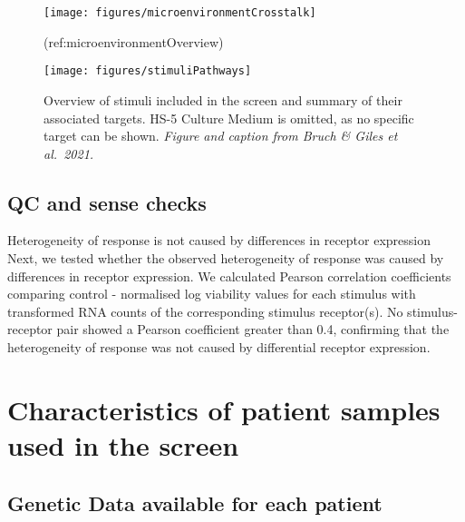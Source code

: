 \documentclass[11pt, a4paper, twosided]{book}
\begin{document}
\begin{figure}

{\centering \texttt{[image: figures/microenvironmentCrosstalk]} 

}

\caption{(ref:microenvironmentOverview)}\label{fig:microenvironmentCrosstalk}
\end{figure}

\begin{figure}

{\centering \texttt{[image: figures/stimuliPathways]} 

}

\caption{Overview of stimuli included in the screen and summary of their associated targets. HS-5 Culture Medium is omitted, as no specific target can be shown. \emph{Figure and caption from Bruch \& Giles et al.~2021.}}\label{fig:stimuliPathways}
\end{figure}
\hypertarget{qc-and-sense-checks}{%
\subsection{QC and sense checks}\label{qc-and-sense-checks}}

Heterogeneity of response is not caused by differences in receptor expression
Next, we tested whether the observed heterogeneity of response was caused by differences in receptor expression. We calculated Pearson correlation coefficients comparing control - normalised log viability values for each stimulus with transformed RNA counts of the corresponding stimulus receptor(s). No stimulus-receptor pair showed a Pearson coefficient greater than 0.4, confirming that the heterogeneity of response was not caused by differential receptor expression.



\hypertarget{characteristics-of-patient-samples-used-in-the-screen}{%
\section{Characteristics of patient samples used in the screen}\label{characteristics-of-patient-samples-used-in-the-screen}}

\hypertarget{genetic-data-available-for-each-patient}{%
\subsection{Genetic Data available for each patient}\label{genetic-data-available-for-each-patient}}
\end{document}
